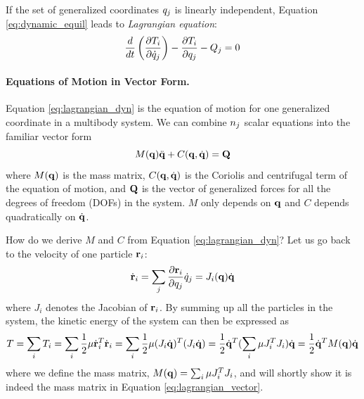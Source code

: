 If the set of generalized coordinates $q_j$ is linearly
independent, Equation \ref{eq:dynamic_equil} leads to
\emph{Lagrangian equation}:
\begin{equation}\label{eq:lagrangian_dyn}
    \frac{d}{dt} \left( \frac{\partial T_i}{\partial
    \dot{q}_j} \right) - \frac{\partial T_i}{\partial
    q_j} - Q_{j} = 0
\end{equation}

\paragraph{Equations of Motion in Vector Form.} Equation
\ref{eq:lagrangian_dyn} is the equation of motion for one generalized coordinate in a
multibody system. We can combine $n_j$  scalar equations into
the familiar vector form
\begin{equation}\label{eq:lagrangian_vector}
M(\mathbf{q}) \ddot{\mathbf{q}} + C(\mathbf{q}, \dot{\mathbf{q}}) = \mathbf{Q} 
\end{equation}
where $M(\mathbf{q})$ is the mass matrix, $C(\mathbf{q}, \dot{\mathbf{q}})$ is the
Coriolis and centrifugal term of the equation of motion, and $\mathbf{Q}$
is the vector of generalized forces for all the degrees of freedom
(DOFs) in the system. $M$ only depends on $\mathbf{q}$ and $C$ depends
quadratically on $\dot{\mathbf{q}}$.

How do we derive $M$ and $C$ from Equation \ref{eq:lagrangian_dyn}?
Let us go back to the velocity of one particle $\mathbf{r}_i$:
\begin{equation}
\dot{\mathbf{r}}_i = \sum_j \frac{\partial
  \mathbf{r}_i}{\partial q_j} \dot{q}_j = J_i(\mathbf{q}) \dot{\mathbf{q}}
\end{equation}
where $J_i$ denotes the Jacobian of $\mathbf{r}_i$. By summing up
all the particles in the system, the kinetic
energy of the system can then be expressed as
\begin{equation}
\label{eq:kinetic_vector}
T = \sum_i T_i = \sum_i \frac{1}{2}  \mathbf{\mu} \dot{\mathbf{r}}_i^{T}
    \dot{\mathbf{r}}_i = \sum_i \frac{1}{2}  \mathbf{\mu} (J_i
    \dot{\mathbf{q}})^T(J_i \dot{\mathbf{q}}) = \frac{1}{2} \dot{\mathbf{q}}^T
    (\sum_i \mathbf{\mu} J_i^TJ_i) \dot{\mathbf{q}} = \frac{1}{2}
    \dot{\mathbf{q}}^T M(\mathbf{q}) \dot{\mathbf{q}}
\end{equation}
where we define the mass matrix, $M(\mathbf{q}) = \sum_i \mathbf{\mu}
J_i^TJ_i$, and will shortly show it is indeed the mass matrix in
Equation \ref{eq:lagrangian_vector}.

